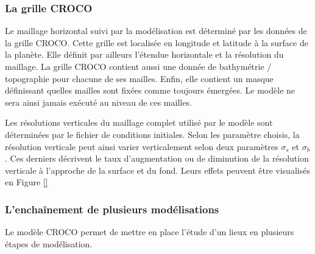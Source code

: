 \documentclass[10pt,a4paper,titlepage]{article}
\begin{document}
\subsubsection{La grille CROCO}
\label{subsub:grille_croco}
Le maillage horizontal suivi par la modélisation est déterminé par les données de la grille CROCO. Cette grille est localisée en longitude et latitude à la surface de la planète.
Elle définit par ailleurs l'étendue horizontale et la résolution du maillage.
La grille CROCO contient aussi une donnée de bathymétrie / topographie pour chacune de ses mailles.
Enfin, elle contient un masque définissant quelles mailles sont fixées comme toujours émergées.
Le modèle ne sera ainsi jamais exécuté au niveau de ces mailles.

Les résolutions verticales du maillage complet utilisé par le modèle sont déterminées par le fichier de conditions initiales.
Selon les paramètre choisis, la résolution verticale peut ainsi varier verticalement selon deux paramètres $\sigma_{s}$ et $\sigma_{b}$.
Ces derniers décrivent le taux d'augmentation ou de diminution de la résolution verticale à l'approche de la surface et du fond.
Leurs effets peuvent être visualisés en Figure \ref{}

\subsubsection{L'enchaînement de plusieurs modélisations}
\label{subsub:enchainement_modelisations}
Le modèle CROCO permet de mettre en place l'étude d'un lieux en plusieurs étapes de modélisation.
\end{document}
